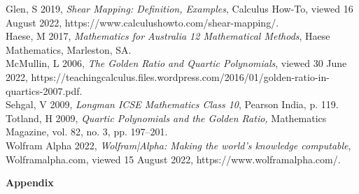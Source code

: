 \documentclass{homework}
\begin{document}
\begin{flushleft}
\begin{thebibliography}{6}
    Glen, S 2019, \emph{Shear Mapping: Definition, Examples}, Calculus How-To, viewed 16 August 2022, https://www.calculushowto.com/shear-mapping/. \vspace{1em} \\
    Haese, M 2017, \emph{Mathematics for Australia 12 Mathematical Methods}, Haese Mathematics, Marleston, SA. \vspace{1em} \\
    McMullin, L 2006, \emph{The Golden Ratio and Quartic Polynomials}, viewed 30 June 2022, https://teachingcalculus.files.wordpress.com/2016/01/golden-ratio-in-quartics-2007.pdf. \vspace{1em} \\
    Sehgal, V 2009, \emph{Longman ICSE Mathematics Class 10}, Pearson India, p. 119. \vspace{1em} \\
    Totland, H 2009, \emph{Quartic Polynomials and the Golden Ratio,} Mathematics Magazine, vol. 82, no. 3, pp. 197–201. \vspace{1em} \\
    Wolfram Alpha 2022, \emph{Wolfram|Alpha: Making the world’s knowledge computable}, Wolframalpha.com, viewed 15 August 2022, https://www.wolframalpha.com/.
    \vspace{1em} \\
\end{thebibliography}
\end{flushleft}
\newpage
\begin{center}
    \textbf{Appendix}
\end{center}
\end{document}
